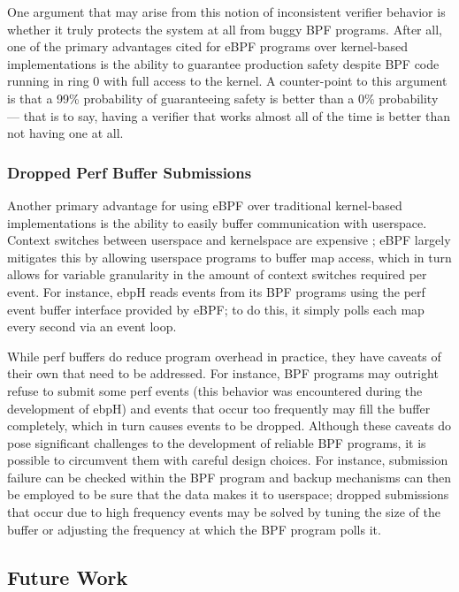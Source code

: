 \documentclass[
  12pt]{findlay}
\begin{document}
One argument that may arise from this notion of inconsistent verifier
behavior is whether it truly protects the system at all from buggy BPF
programs. After all, one of the primary advantages cited for eBPF
programs over kernel-based implementations is the ability to guarantee
production safety despite BPF code running in ring 0 with full access to
the kernel. A counter-point to this argument is that a 99\% probability
of guaranteeing safety is better than a 0\% probability --- that is to
say, having a verifier that works almost all of the time is better than
not having one at all.

\hypertarget{dropped-perf-buffer-submissions}{%
\subsubsection{Dropped Perf Buffer
Submissions}\label{dropped-perf-buffer-submissions}}

Another primary advantage for using eBPF over traditional kernel-based
implementations is the ability to easily buffer communication with
userspace. Context switches between userspace and kernelspace are
expensive \autocite{gebai18}; eBPF largely mitigates this by allowing
userspace programs to buffer map access, which in turn allows for
variable granularity in the amount of context switches required per
event. For instance, ebpH reads events from its BPF programs using the
perf event buffer interface provided by eBPF; to do this, it simply
polls each map every second via an event loop.

While perf buffers do reduce program overhead in practice, they have
caveats of their own that need to be addressed. For instance, BPF
programs may outright refuse to submit some perf events (this behavior
was encountered during the development of ebpH) and events that occur
too frequently may fill the buffer completely, which in turn causes
events to be dropped. Although these caveats do pose significant
challenges to the development of reliable BPF programs, it is possible
to circumvent them with careful design choices. For instance, submission
failure can be checked within the BPF program and backup mechanisms can
then be employed to be sure that the data makes it to userspace; dropped
submissions that occur due to high frequency events may be solved by
tuning the size of the buffer or adjusting the frequency at which the
BPF program polls it.

\hypertarget{future-work}{%
\subsection{Future Work}\label{future-work}}
\end{document}
